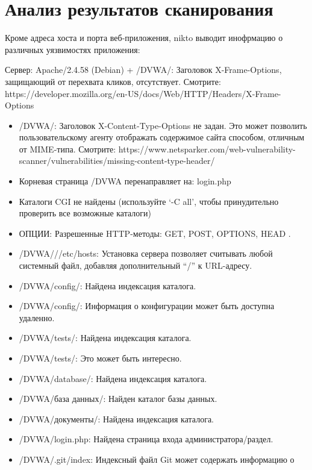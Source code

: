 \documentclass[
  english,
  russian,
  12pt,
  a4paper,
  DIV=11,
  numbers=noendperiod]{scrreprt}
\begin{document}
\section{Анализ результатов
сканирования}\label{ux430ux43dux430ux43bux438ux437-ux440ux435ux437ux443ux43bux44cux442ux430ux442ux43eux432-ux441ux43aux430ux43dux438ux440ux43eux432ux430ux43dux438ux44f}

Кроме адреса хоста и порта веб-приложения, nikto выводит инофрмацию о
различных уязвимостях приложения:

Сервер: Apache/2.4.58 (Debian) + /DVWA/: Заголовок X-Frame-Options,
защищающий от перехвата кликов, отсутствует. Смотрите:
https://developer.mozilla.org/en-US/docs/Web/HTTP/Headers/X-Frame-Options

\begin{itemize}
\item
  /DVWA/: Заголовок X-Content-Type-Options не задан. Это может позволить
  пользовательскому агенту отображать содержимое сайта способом,
  отличным от MIME-типа. Смотрите:
  https://www.netsparker.com/web-vulnerability-scanner/vulnerabilities/missing-content-type-header/
\item
  Корневая страница /DVWA перенаправляет на: login.php
\item
  Каталоги CGI не найдены (используйте \enquote*{-C all}, чтобы
  принудительно проверить все возможные каталоги)
\item
  ОПЦИИ: Разрешенные HTTP-методы: GET, POST, OPTIONS, HEAD .
\item
  /DVWA///etc/hosts: Установка сервера позволяет считывать любой
  системный файл, добавляя дополнительный \enquote{/} к URL-адресу.
\item
  /DVWA/config/: Найдена индексация каталога.
\item
  /DVWA/config/: Информация о конфигурации может быть доступна удаленно.
\item
  /DVWA/tests/: Найдена индексация каталога.
\item
  /DVWA/tests/: Это может быть интересно.
\item
  /DVWA/database/: Найдена индексация каталога.
\item
  /DVWA/база данных/: Найден каталог базы данных.
\item
  /DVWA/документы/: Найдена индексация каталога.
\item
  /DVWA/login.php: Найдена страница входа администратора/раздел.
\item
  /DVWA/.git/index: Индексный файл Git может содержать информацию о

\end{itemize}
\end{document}

